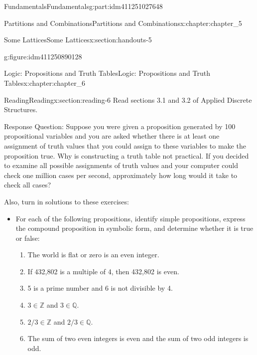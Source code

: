 \documentclass[oneside,10pt,]{book}
\numberwithin{equation}{section}
\begin{document}
\begin{partptx}{Fundamentals}{}{Fundamentals}{}{}{g:part:idm411251027648}
\begin{chapterptx}{Partitions and Combinations}{}{Partitions and Combinations}{}{}{x:chapter:chapter_5}
\begin{sectionptx}{Some Lattices}{}{Some Lattices}{}{}{x:section:handouts-5}
\begin{figureptx}{}{g:figure:idm411250890128}{}
\begin{image}{0.125}{0.75}{0.125}
\end{image}%
\tcblower
\end{figureptx}%
\end{sectionptx}
\end{chapterptx}
%
\typeout{************************************************}
\typeout{************************************************}
%
\begin{chapterptx}{Logic: Propositions and Truth Tables}{}{Logic: Propositions and Truth Tables}{}{}{x:chapter:chapter_6}
%
%
%
\typeout{************************************************}
\typeout{************************************************}
%
\begin{sectionptx}{Reading}{}{Reading}{}{}{x:section:reading-6}
Read sections 3.1 and 3.2 of Applied Discrete Structures.%
\par
Response Question: Suppose you were given a proposition generated by 100 propositional variables and you are asked whether there is at least one assignment of truth values that you could assign to these variables to make the proposition true. Why is constructing a truth table not practical.  If you decided to examine all possible assignments of truth values and your computer could check one million cases per second, approximately how long would it take to check all cases?%
\par
Also, turn in solutions to these exercises:%
\begin{itemize}[label=\textbullet]
\item{}For each of the following propositions, identify simple propositions, express the compound proposition in symbolic form, and determine whether it is true or false:%
\par
%
\begin{enumerate}[label=(\alph*)]
\item{}The world is flat or zero is an even integer.%
\item{}If 432,802 is a multiple of 4, then 432,802 is even.%
\item{}5 is a prime number and 6 is not divisible by 4.%
\item{}\(3 \in \mathbb{Z}\) and \(3 \in  \mathbb{Q}\).%
\item{}\(2/3 \in  \mathbb{Z}\) and \(2/3 \in  \mathbb{Q}\).%
\item{}The sum of two even integers is even and the sum of two odd integers is odd.%
\end{enumerate}

\end{itemize}
\end{sectionptx}
\end{chapterptx}
\end{partptx}
\end{document}
